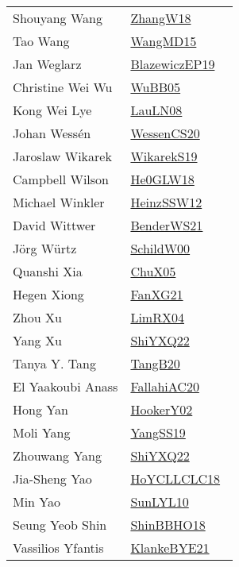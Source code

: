 {\begin{longtable}{p{4cm}p{20cm}}
Shouyang Wang & \href{works/ZhangW18.pdf}{ZhangW18}~\cite{ZhangW18}\\
Tao Wang & \href{works/WangMD15.pdf}{WangMD15}~\cite{WangMD15}\\
Jan Weglarz & \href{}{BlazewiczEP19}~\cite{BlazewiczEP19}\\
Christine Wei Wu & \href{works/WuBB05.pdf}{WuBB05}~\cite{WuBB05}\\
Kong Wei Lye & \href{works/LauLN08.pdf}{LauLN08}~\cite{LauLN08}\\
Johan Wess{\'{e}}n & \href{works/WessenCS20.pdf}{WessenCS20}~\cite{WessenCS20}\\
Jaroslaw Wikarek & \href{works/WikarekS19.pdf}{WikarekS19}~\cite{WikarekS19}\\
Campbell Wilson & \href{works/He0GLW18.pdf}{He0GLW18}~\cite{He0GLW18}\\
Michael Winkler & \href{works/HeinzSSW12.pdf}{HeinzSSW12}~\cite{HeinzSSW12}\\
David Wittwer & \href{works/BenderWS21.pdf}{BenderWS21}~\cite{BenderWS21}\\
J{\"{o}}rg W{\"{u}}rtz & \href{works/SchildW00.pdf}{SchildW00}~\cite{SchildW00}\\
Quanshi Xia & \href{works/ChuX05.pdf}{ChuX05}~\cite{ChuX05}\\
Hegen Xiong & \href{works/FanXG21.pdf}{FanXG21}~\cite{FanXG21}\\
Zhou Xu & \href{works/LimRX04.pdf}{LimRX04}~\cite{LimRX04}\\
Yang Xu & \href{}{ShiYXQ22}~\cite{ShiYXQ22}\\
Tanya Y. Tang & \href{works/TangB20.pdf}{TangB20}~\cite{TangB20}\\
El Yaakoubi Anass & \href{}{FallahiAC20}~\cite{FallahiAC20}\\
Hong Yan & \href{works/HookerY02.pdf}{HookerY02}~\cite{HookerY02}\\
Moli Yang & \href{works/YangSS19.pdf}{YangSS19}~\cite{YangSS19}\\
Zhouwang Yang & \href{}{ShiYXQ22}~\cite{ShiYXQ22}\\
Jia{-}Sheng Yao & \href{works/HoYCLLCLC18.pdf}{HoYCLLCLC18}~\cite{HoYCLLCLC18}\\
Min Yao & \href{works/SunLYL10.pdf}{SunLYL10}~\cite{SunLYL10}\\
Seung Yeob Shin & \href{works/ShinBBHO18.pdf}{ShinBBHO18}~\cite{ShinBBHO18}\\
Vassilios Yfantis & \href{works/KlankeBYE21.pdf}{KlankeBYE21}~\cite{KlankeBYE21}\\

\end{longtable}}
